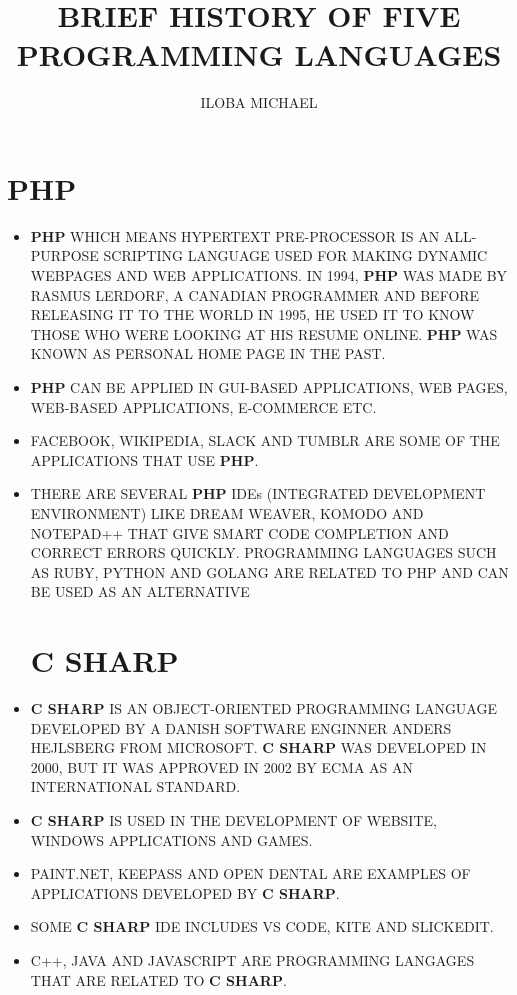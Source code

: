 \documentclass[12pt]{article}
\title {BRIEF HISTORY OF FIVE PROGRAMMING LANGUAGES}
\author{ILOBA MICHAEL}
\begin{document}
	\maketitle
	\newpage
	\section{PHP}

	\begin{itemize}
		

	\item \textbf{PHP} WHICH MEANS HYPERTEXT PRE-PROCESSOR IS AN ALL-PURPOSE SCRIPTING LANGUAGE USED FOR MAKING DYNAMIC WEBPAGES AND WEB APPLICATIONS. IN 1994, \textbf{PHP} WAS MADE BY RASMUS LERDORF, A CANADIAN PROGRAMMER AND BEFORE RELEASING IT TO THE WORLD IN 1995, HE USED IT TO KNOW THOSE WHO WERE LOOKING AT HIS RESUME ONLINE. \textbf{PHP} WAS KNOWN AS PERSONAL HOME PAGE IN THE PAST.
	
	\item \textbf{PHP} CAN BE APPLIED IN GUI-BASED APPLICATIONS, WEB PAGES, WEB-BASED APPLICATIONS, E-COMMERCE ETC.

	\item FACEBOOK, WIKIPEDIA, SLACK AND TUMBLR ARE SOME OF THE APPLICATIONS THAT USE \textbf{PHP}.

	\item THERE ARE SEVERAL \textbf{PHP} IDEs (INTEGRATED DEVELOPMENT ENVIRONMENT) LIKE DREAM WEAVER, KOMODO AND NOTEPAD++ THAT GIVE SMART CODE COMPLETION AND CORRECT ERRORS QUICKLY.
	PROGRAMMING LANGUAGES SUCH AS RUBY, PYTHON AND GOLANG ARE RELATED TO PHP AND CAN BE USED AS AN ALTERNATIVE
	
		\newpage
	\section{C SHARP}
\item	\textbf{C SHARP} IS AN OBJECT-ORIENTED PROGRAMMING LANGUAGE DEVELOPED BY A DANISH SOFTWARE ENGINNER ANDERS HEJLSBERG FROM MICROSOFT. \textbf{C SHARP} WAS DEVELOPED IN 2000, BUT IT WAS APPROVED IN 2002 BY ECMA AS AN INTERNATIONAL STANDARD.
	\item	\textbf{C SHARP} IS USED IN THE DEVELOPMENT OF WEBSITE, WINDOWS APPLICATIONS AND GAMES.
	\item
	PAINT.NET, KEEPASS AND OPEN DENTAL ARE EXAMPLES OF APPLICATIONS DEVELOPED BY \textbf{C SHARP}.
	\item
	SOME \textbf{C SHARP} IDE INCLUDES VS CODE, KITE AND SLICKEDIT.
	\item
	C++, JAVA AND JAVASCRIPT ARE PROGRAMMING LANGAGES THAT ARE RELATED TO \textbf{C SHARP}.
	\newpage

\end{itemize}
\end{document}
